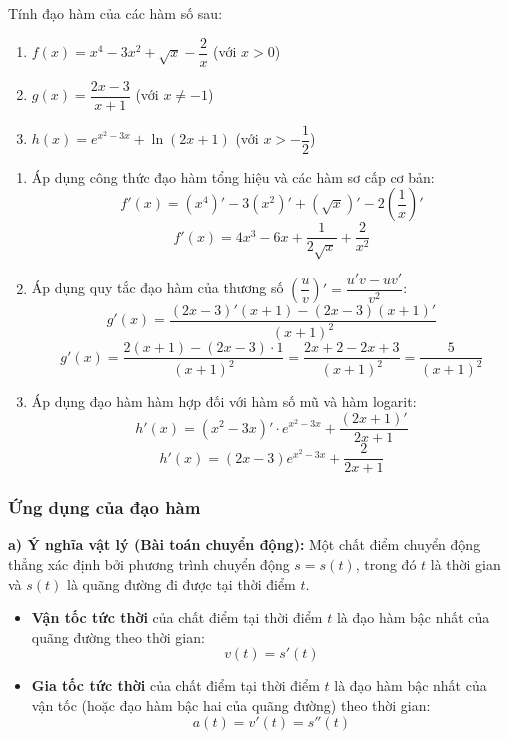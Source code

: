 \documentclass[12pt]{article}
\begin{document}
	\begin{vidu}[1]
		Tính đạo hàm của các hàm số sau:
		\begin{enumerate}[label=\alph*)]
			\item $f(x) = x^4 - 3x^2 + \sqrt{x} - \dfrac{2}{x}$ \quad (với $x > 0$)
			\item $g(x) = \dfrac{2x - 3}{x + 1}$ \quad (với $x \neq -1$)
			\item $h(x) = e^{x^2 - 3x} + \ln(2x + 1)$ \quad (với $x > -\dfrac{1}{2}$)
		\end{enumerate}
	\end{vidu}
	
	\begin{loigiai}
		\begin{enumerate}[label=\alph*)]
			\item Áp dụng công thức đạo hàm tổng hiệu và các hàm sơ cấp cơ bản:
			$$f'(x) = (x^4)' - 3(x^2)' + (\sqrt{x})' - 2\left(\dfrac{1}{x}\right)'$$
			$$f'(x) = 4x^3 - 6x + \dfrac{1}{2\sqrt{x}} + \dfrac{2}{x^2}$$
			
			\item Áp dụng quy tắc đạo hàm của thương số $\left(\dfrac{u}{v}\right)' = \dfrac{u'v - uv'}{v^2}$:
			$$g'(x) = \dfrac{(2x-3)'(x+1) - (2x-3)(x+1)'}{(x+1)^2}$$
			$$g'(x) = \dfrac{2(x+1) - (2x-3) \cdot 1}{(x+1)^2} = \dfrac{2x + 2 - 2x + 3}{(x+1)^2} = \dfrac{5}{(x+1)^2}$$
			
			\item Áp dụng đạo hàm hàm hợp đối với hàm số mũ và hàm logarit:
			$$h'(x) = (x^2 - 3x)' \cdot e^{x^2 - 3x} + \dfrac{(2x+1)'}{2x+1}$$
			$$h'(x) = (2x - 3)e^{x^2 - 3x} + \dfrac{2}{2x+1}$$
		\end{enumerate}
	\end{loigiai}
	
	\subsubsection{Ứng dụng của đạo hàm}
	
	\textbf{a) Ý nghĩa vật lý (Bài toán chuyển động):}
	Một chất điểm chuyển động thẳng xác định bởi phương trình chuyển động $s = s(t)$, trong đó $t$ là thời gian và $s(t)$ là quãng đường đi được tại thời điểm $t$.
	\begin{itemize}
		\item \textbf{Vận tốc tức thời} của chất điểm tại thời điểm $t$ là đạo hàm bậc nhất của quãng đường theo thời gian:
		$$v(t) = s'(t)$$
		\item \textbf{Gia tốc tức thời} của chất điểm tại thời điểm $t$ là đạo hàm bậc nhất của vận tốc (hoặc đạo hàm bậc hai của quãng đường) theo thời gian:
		$$a(t) = v'(t) = s''(t)$$
	\end{itemize}
	
\end{document}
